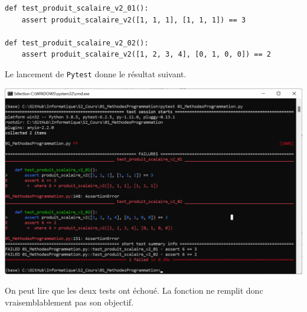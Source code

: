 \begin{lstlisting}
def test_produit_scalaire_v2_01():
    assert produit_scalaire_v2([1, 1, 1], [1, 1, 1]) == 3

def test_produit_scalaire_v2_02():
    assert produit_scalaire_v2([1, 2, 3, 4], [0, 1, 0, 0]) == 2
\end{lstlisting}

Le lancement de \texttt{Pytest} donne le résultat suivant. 

\begin{center}
\includegraphics[width=.8\linewidth]{pytest}
\end{center}


On peut lire que les deux tests ont échoué. La fonction ne remplit donc vraisemblablement pas son objectif. 

